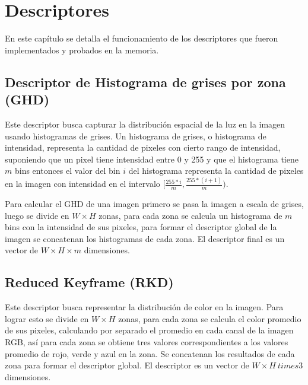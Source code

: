 \chapter{Descriptores}
 En este capítulo se detalla el funcionamiento de los descriptores que fueron implementados y probados en la memoria.
\section{Descriptor de Histograma de grises por zona (GHD)}
Este descriptor busca capturar la distribución espacial de la luz en la imagen usando histogramas de grises. Un histograma de grises, o histograma de intensidad, representa la cantidad de pixeles con cierto rango de intensidad, suponiendo que un pixel tiene intensidad entre 0 y 255 y que el histograma tiene $m$ bins entonces el valor del bin $i$ del histograma representa la cantidad de pixeles en la imagen con intensidad en el intervalo $[\frac{255*i}{m},\frac{255*(i+1)}{m})$.

Para calcular el GHD de una imagen primero se pasa la imagen a escala de grises, luego se divide en $W \times H$ zonas, para cada zona se calcula un histograma de $m$ bins con la intensidad de sus pixeles, para formar el descriptor global de la imagen se concatenan los histogramas de cada zona. El descriptor final es un vector de $W \times H \times m$ dimensiones.

\section{Reduced Keyframe (RKD)}
Este descriptor busca representar la distribución de color en la imagen. Para lograr esto se divide en $W \times H$ zonas, para cada zona se calcula el color promedio de sus pixeles, calculando por separado el promedio en cada canal de la imagen RGB, así para cada zona se obtiene tres valores correspondientes a los valores promedio de rojo, verde y azul en la zona. Se concatenan los resultados de cada zona para formar el descriptor global. El descriptor es un vector de $W \times H \ times 3$ dimensiones.

